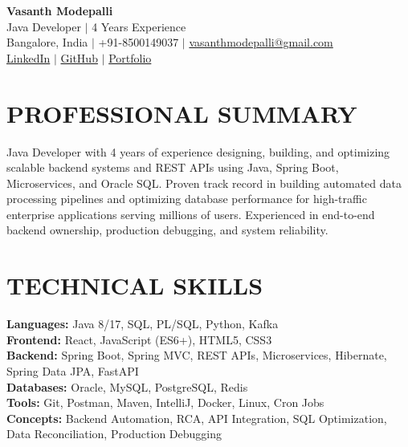 \documentclass[a4paper,10pt]{article}
\begin{document}
\begin{center}
    {\Huge \textbf{Vasanth Modepalli}} \\ \vspace{2pt}
    Java Developer $|$ 4 Years Experience \\ \vspace{1pt}
    Bangalore, India $|$ +91-8500149037 $|$ \href{mailto:vasanthmodepalli@gmail.com}{vasanthmodepalli@gmail.com} \\ \vspace{2pt}
    \href{https://linkedin.com/in/}{LinkedIn} $|$ \href{https://github.com/}{GitHub} $|$ \href{https://portfolio.com/}{Portfolio}
\end{center}

\section*{PROFESSIONAL SUMMARY}
Java Developer with 4 years of experience designing, building, and optimizing scalable backend systems and REST APIs using Java, Spring Boot, Microservices, and Oracle SQL. Proven track record in building automated data processing pipelines and optimizing database performance for high-traffic enterprise applications serving millions of users. Experienced in end-to-end backend ownership, production debugging, and system reliability.

\section*{TECHNICAL SKILLS}
\textbf{Languages:} Java 8/17, SQL, PL/SQL, Python, Kafka \\
\textbf{Frontend:} React, JavaScript (ES6+), HTML5, CSS3 \\
\textbf{Backend:} Spring Boot, Spring MVC, REST APIs, Microservices, Hibernate, Spring Data JPA, FastAPI \\
\textbf{Databases:} Oracle, MySQL, PostgreSQL, Redis \\
\textbf{Tools:} Git, Postman, Maven, IntelliJ, Docker, Linux, Cron Jobs \\
\textbf{Concepts:} Backend Automation, RCA, API Integration, SQL Optimization, Data Reconciliation, Production Debugging
\end{document}
